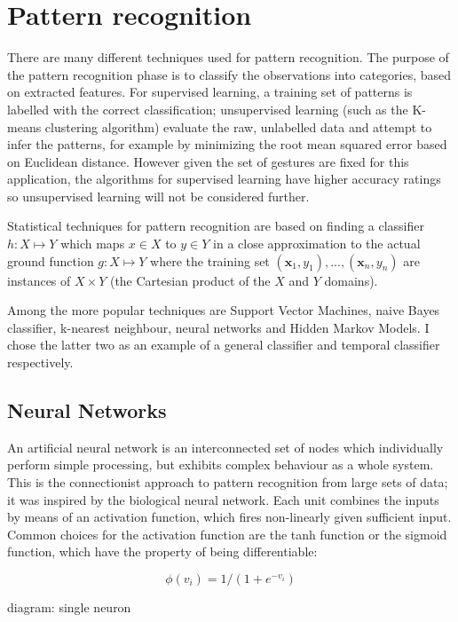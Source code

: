 \documentclass[12pt,a4,notitlepage]{report}
\renewcommand{\_}{\texttt{\symbol{95}}}
\newcommand{\<}{\texttt{\symbol{60}}}
\renewcommand{\>}{\texttt{\symbol{62}}}
\begin{document}
\section{Pattern recognition}

There are many different techniques used for pattern recognition. The purpose of the pattern recognition phase is to classify the observations into categories, based on extracted features. For supervised learning, a training set of patterns is labelled with the correct classification; unsupervised learning (such as the K-means clustering algorithm) evaluate the raw, unlabelled data and attempt to infer the patterns, for example by minimizing the root mean squared error based on Euclidean distance. However given the set of gestures are fixed for this application, the algorithms for supervised learning have higher accuracy ratings so unsupervised learning will not be considered further.

Statistical techniques for pattern recognition are based on finding a classifier
$ h: X \mapsto Y $ which maps $x \in X$ to $y \in Y$ in a close approximation to the actual ground function $ g: X \mapsto Y $ where the training set $ (\mathbf x_1,y_1), ... , (\mathbf x_n, y_n) $ are instances of $X \times Y$ (the Cartesian product of the $X$ and $Y$ domains).

Among the more popular techniques are Support Vector Machines, naive Bayes classifier, k-nearest neighbour, neural networks and Hidden Markov Models. I chose the latter two as an example of a general classifier and temporal classifier respectively.

\subsection{Neural Networks}

An artificial neural network is an interconnected set of nodes which individually perform simple processing, but exhibits complex behaviour as a whole system. This is the connectionist approach to pattern recognition from large sets of data; it was inspired by the biological neural network. Each unit combines the inputs by means of an activation function, which fires non-linearly given sufficient input. Common choices for the activation function are the tanh function or the sigmoid function, which have the property of being differentiable:

\[ \phi(v_i) = 1/(1+e^{-v_i}) \]

{diagram: single neuron}
\end{document}
